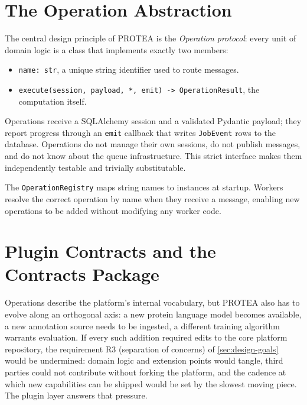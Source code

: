 \section{The Operation Abstraction}
\label{sec:operation-abstraction}

The central design principle of PROTEA is the \textit{Operation protocol}: every
unit of domain logic is a class that implements exactly two members:

\begin{itemize}
  \item \texttt{name: str}, a unique string identifier used to route messages.
  \item \texttt{execute(session, payload, *, emit) -> OperationResult}, the
    computation itself.
\end{itemize}

Operations receive a SQLAlchemy session and a validated Pydantic payload; they
report progress through an \texttt{emit} callback that writes \texttt{JobEvent}
rows to the database. Operations do not manage their own sessions, do not
publish messages, and do not know about the queue infrastructure. This strict
interface makes them independently testable and trivially substitutable.

The \texttt{OperationRegistry} maps string names to instances at startup. Workers
resolve the correct operation by name when they receive a message, enabling
new operations to be added without modifying any worker code.

\section{Plugin Contracts and the Contracts Package}
\label{sec:plugin-contracts}

Operations describe the platform's internal vocabulary, but PROTEA also has
to evolve along an orthogonal axis: a new protein language model becomes
available, a new annotation source needs to be ingested, a different
training algorithm warrants evaluation. If every such addition required
edits to the core platform repository, the requirement R3 (separation of
concerns) of \cref{sec:design-goals} would be undermined: domain logic and
extension points would tangle, third parties could not contribute without
forking the platform, and the cadence at which new capabilities can be
shipped would be set by the slowest moving piece. The plugin layer answers
that pressure.

